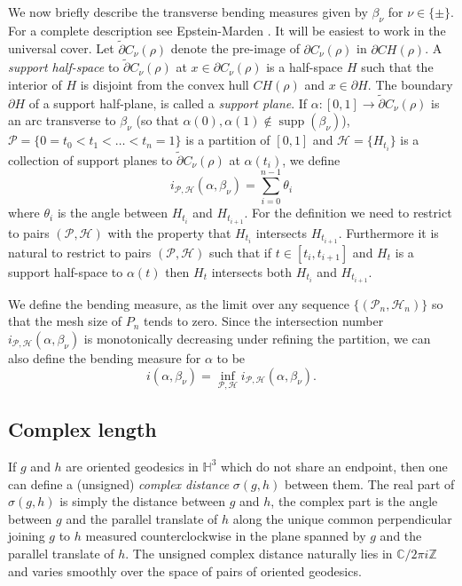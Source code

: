 \documentclass{amsart}
\theoremstyle{plain}
\theoremstyle{definition}
\theoremstyle{remark}
\newcommand{\supp}{{\operatorname{supp}}}
\newcommand{\<}{\left <}
\renewcommand{\>}{\right >}
\begin{document}
We now briefly describe  the transverse bending measures  given by $\beta_\nu$ for $\nu \in \{\pm\}$. For a complete description see Epstein-Marden \cite{EM}. 
It will be easiest to work in the universal cover. Let $\tilde\partial C_\nu(\rho)$ denote the pre-image of $\partial C_\nu(\rho)$ in $\partial CH(\rho)$.
A {\em support half-space} to $\tilde\partial C_\nu(\rho)$ at $x \in \partial C_\nu(\rho)$ is a half-space $H$ such that  the interior of $H$ 
is disjoint from the convex hull $CH(\rho)$ and $x\in\partial H$. The boundary $\partial H$ of a support half-plane, is called a {\em support plane}.
If $\alpha:[0,1]\rightarrow \tilde\partial C_\nu(\rho)$ is an arc  transverse to $\beta_\nu$ (so that $\alpha(0),\alpha(1)\notin\supp(\beta_\nu)$), 
$\mathcal P=\{0 = t_0 < t_1 <\ldots < t_n = 1\}$ 
is a partition of $[0,1]$ and $\mathcal H=\{H_{t_i}\}$ is a collection of support planes to
$\tilde\partial C_\nu(\rho)$ at $\alpha(t_i)$, we define
$$i_{\mathcal P,\mathcal H}(\alpha, \beta_\nu) = \sum_{i=0}^{n-1}\theta_{i}$$
where $\theta_i$ is the angle between $H_{t_i}$ and $H_{t_{i+1}}$.
For the definition we  need to restrict  to pairs $(\mathcal P,\mathcal H)$ with the property that $H_{t_i}$ intersects $H_{t_{i+1}}$. 
Furthermore it is natural to restrict to pairs $(\mathcal P,\mathcal H)$ such that if $t \in [t_i, t_{i+1}]$ and $H_t$ is a support half-space to $\alpha(t)$ then $H_t$ intersects both $H_{t_i}$ and $H_{t_{i+1}}$.

We define the bending measure, as the limit over any sequence $\{(\mathcal P_n,\mathcal H_n)\}$ so that the mesh size of $P_n$ tends to zero.  
Since the intersection number $i_{\mathcal P,\mathcal H}(\alpha, \beta_\nu)$ is monotonically decreasing under refining the partition, 
we can also define the bending measure for $\alpha$ to be 
$$i(\alpha, \beta_\nu)  = \inf_{\mathcal P, \mathcal H}i_{\mathcal P, \mathcal H}(\alpha, \beta_\nu).$$




\subsection{Complex length}
If $g$ and $h$ are oriented geodesics in $\mathbb H^3$ which do not share an endpoint, then one can define a 
(unsigned) {\em complex distance} $\sigma(g,h)$ between them. The real part of $\sigma(g,h)$ is simply the distance between
$g$ and $h$, the complex part is the angle between $g$ and the parallel translate of $h$ along the unique common
perpendicular joining $g$ to $h$ measured counterclockwise in the plane spanned by $g$ and the parallel translate of $h$. 
The unsigned complex distance naturally lies in $\mathbb C/2\pi i \mathbb{Z}$ and 
varies smoothly over the space of pairs of oriented geodesics.
\end{document}
